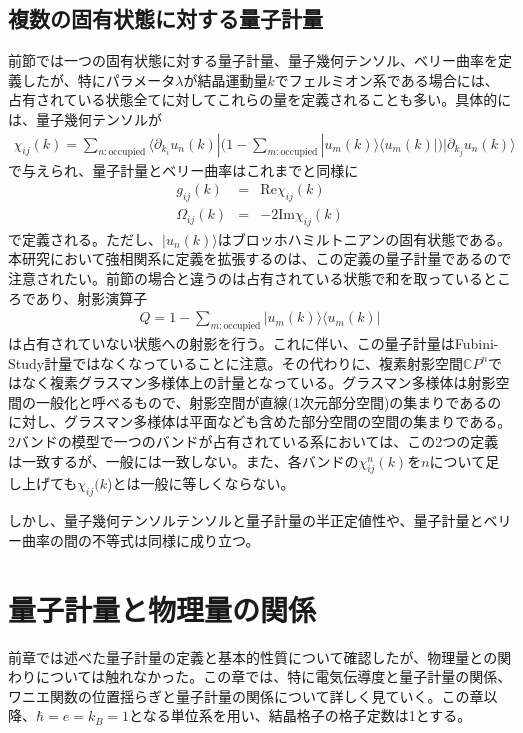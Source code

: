 \documentclass[12pt]{jsbook}
\newcommand{\la}{\langle}
\newcommand{\ra}{\rangle}
\newcommand{\pa}{\partial}
\begin{document}
\section{複数の固有状態に対する量子計量}
前節では一つの固有状態に対する量子計量、量子幾何テンソル、ベリー曲率を定義したが、特にパラメータ$\lambda$が結晶運動量$k$でフェルミオン系である場合には、占有されている状態全てに対してこれらの量を定義されることも多い。具体的には、量子幾何テンソルが
\begin{eqnarray}
\chi_{ij}(k)=\displaystyle \sum_{n:\mathrm{occupied}}\la \pa_{k_i} u_n(k)|\Big(1-\displaystyle\sum_{m:\mathrm{occupied}}|u_m(k)\ra\la u_m(k)|\Big)|\pa_{k_j} u_n(k)\ra
\end{eqnarray}
で与えられ、量子計量とベリー曲率はこれまでと同様に
\begin{eqnarray}
    g_{ij}(k)&=&\mathrm{Re} \chi_{ij}(k)\\
    \Omega_{ij}(k)&=&-2\mathrm{Im}\chi_{ij}(k)
\end{eqnarray}
で定義される。ただし、$|u_n(k)\ra$はブロッホハミルトニアンの固有状態である。本研究において強相関系に定義を拡張するのは、この定義の量子計量であるので注意されたい。前節の場合と違うのは占有されている状態で和を取っているところであり、射影演算子
\begin{eqnarray}
    Q=1-\displaystyle\sum_{m:\mathrm{occupied}}|u_m(k)\ra\la u_m(k)|
\end{eqnarray}
は占有されていない状態への射影を行う。これに伴い、この量子計量はFubini-Study計量ではなくなっていることに注意。その代わりに、複素射影空間$\mathbb{C}P^n$ではなく複素グラスマン多様体上の計量となっている。グラスマン多様体は射影空間の一般化と呼べるもので、射影空間が直線(1次元部分空間)の集まりであるのに対し、グラスマン多様体は平面なども含めた部分空間の空間の集まりである\cite{nakahara2018geometry}。2バンドの模型で一つのバンドが占有されている系においては、この2つの定義は一致するが、一般には一致しない。また、各バンドの$\chi^n_{ij}(k)$を$n$について足し上げても$\chi_{ij}(k$)とは一般に等しくならない。

しかし、量子幾何テンソルテンソルと量子計量の半正定値性や、量子計量とベリー曲率の間の不等式は同様に成り立つ。
\chapter{量子計量と物理量の関係}
前章では述べた量子計量の定義と基本的性質について確認したが、物理量との関わりについては触れなかった。この章では、特に電気伝導度と量子計量の関係、ワニエ関数の位置揺らぎと量子計量の関係について詳しく見ていく。この章以降、$\hbar=e=k_B=1$となる単位系を用い、結晶格子の格子定数は1とする。
\end{document}
